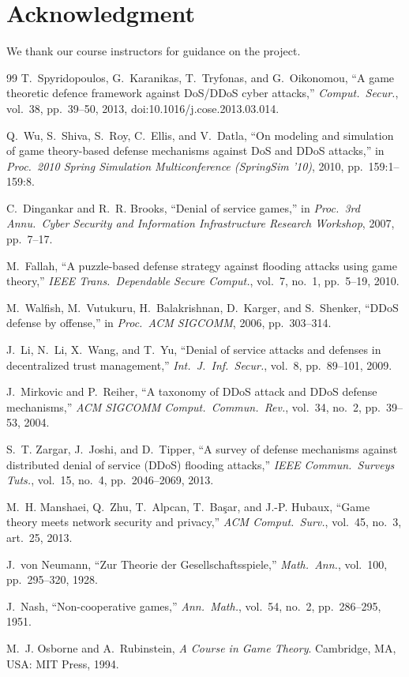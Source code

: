 \documentclass[conference]{IEEEtran}
\begin{document}
\section*{Acknowledgment}
We thank our course instructors for guidance on the project.

\begin{thebibliography}{99}
T.~Spyridopoulos, G.~Karanikas, T.~Tryfonas, and G.~Oikonomou, ``A game theoretic defence framework against {DoS/DDoS} cyber attacks,'' \emph{Comput.\ Secur.}, vol.~38, pp.~39--50, 2013, doi:10.1016/j.cose.2013.03.014.

Q.~Wu, S.~Shiva, S.~Roy, C.~Ellis, and V.~Datla, ``On modeling and simulation of game theory-based defense mechanisms against {DoS} and {DDoS} attacks,'' in \emph{Proc.\ 2010 Spring Simulation Multiconference (SpringSim '10)}, 2010, pp.~159:1--159:8.

C.~Dingankar and R.~R. Brooks, ``Denial of service games,'' in \emph{Proc.\ 3rd Annu.\ Cyber Security and Information Infrastructure Research Workshop}, 2007, pp.~7--17.

M.~Fallah, ``A puzzle-based defense strategy against flooding attacks using game theory,'' \emph{IEEE Trans.\ Dependable Secure Comput.}, vol.~7, no.~1, pp.~5--19, 2010.

M.~Walfish, M.~Vutukuru, H.~Balakrishnan, D.~Karger, and S.~Shenker, ``{DDoS} defense by offense,'' in \emph{Proc.\ ACM SIGCOMM}, 2006, pp.~303--314.

J.~Li, N.~Li, X.~Wang, and T.~Yu, ``Denial of service attacks and defenses in decentralized trust management,'' \emph{Int.\ J.\ Inf.\ Secur.}, vol.~8, pp.~89--101, 2009.

J.~Mirkovic and P.~Reiher, ``A taxonomy of {DDoS} attack and {DDoS} defense mechanisms,'' \emph{ACM SIGCOMM Comput.\ Commun.\ Rev.}, vol.~34, no.~2, pp.~39--53, 2004.

S.~T. Zargar, J.~Joshi, and D.~Tipper, ``A survey of defense mechanisms against distributed denial of service ({DDoS}) flooding attacks,'' \emph{IEEE Commun.\ Surveys Tuts.}, vol.~15, no.~4, pp.~2046--2069, 2013.

M.~H. Manshaei, Q.~Zhu, T.~Alpcan, T.~Ba\c{s}ar, and J.-P. Hubaux, ``Game theory meets network security and privacy,'' \emph{ACM Comput.\ Surv.}, vol.~45, no.~3, art.~25, 2013.

J.~von Neumann, ``Zur Theorie der Gesellschaftsspiele,'' \emph{Math.\ Ann.}, vol.~100, pp.~295--320, 1928.

J.~Nash, ``Non-cooperative games,'' \emph{Ann.\ Math.}, vol.~54, no.~2, pp.~286--295, 1951.

M.~J. Osborne and A.~Rubinstein, \emph{A Course in Game Theory}. Cambridge, MA, USA: MIT Press, 1994.
\end{thebibliography}
\end{document}
